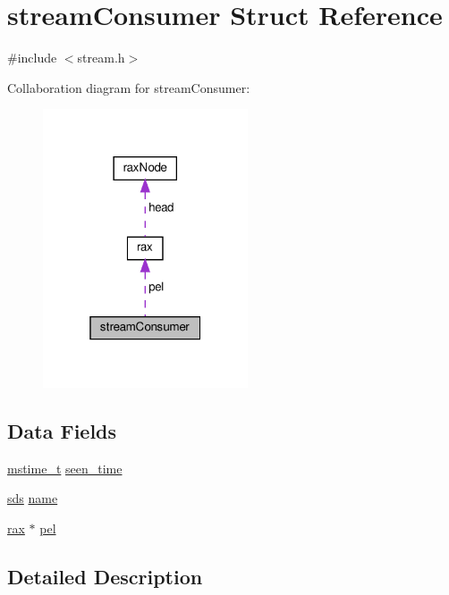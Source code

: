 \hypertarget{structstream_consumer}{}\section{stream\+Consumer Struct Reference}
\label{structstream_consumer}


{\ttfamily \#include $<$stream.\+h$>$}



Collaboration diagram for stream\+Consumer\+:
\nopagebreak
\begin{figure}[H]
\begin{center}
\leavevmode
\includegraphics[width=172pt]{structstream_consumer__coll__graph}
\end{center}
\end{figure}
\subsection*{Data Fields}
\begin{DoxyCompactItemize}
\item 
\hyperlink{redismodule_8h_a652ae61e2475bc8957454534544968fc}{mstime\+\_\+t} \hyperlink{structstream_consumer_a19ba823fbbefd14094b489a211fbdeeb}{seen\+\_\+time}
\item 
\hyperlink{sds_8h_ad69abac3df4532879db9642c95f5ef6f}{sds} \hyperlink{structstream_consumer_a78d661a433637c5e0fac8a377e3ddeb6}{name}
\item 
\hyperlink{structrax}{rax} $\ast$ \hyperlink{structstream_consumer_a2fc8aed22096d11568cb29885cf08cb2}{pel}
\end{DoxyCompactItemize}


\subsection{Detailed Description}


